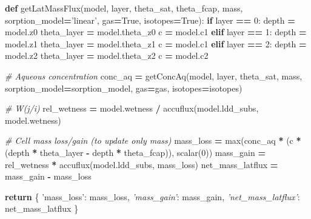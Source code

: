 \documentclass[]{article}
\newenvironment{Shaded}{\begin{snugshade}}{\end{snugshade}}
\newcommand{\KeywordTok}[1]{\textcolor[rgb]{0.13,0.29,0.53}{\textbf{{#1}}}}
\newcommand{\DecValTok}[1]{\textcolor[rgb]{0.00,0.00,0.81}{{#1}}}
\newcommand{\StringTok}[1]{\textcolor[rgb]{0.31,0.60,0.02}{{#1}}}
\newcommand{\CommentTok}[1]{\textcolor[rgb]{0.56,0.35,0.01}{\textit{{#1}}}}
\newcommand{\VariableTok}[1]{\textcolor[rgb]{0.00,0.00,0.00}{{#1}}}
\newcommand{\ControlFlowTok}[1]{\textcolor[rgb]{0.13,0.29,0.53}{\textbf{{#1}}}}
\newcommand{\OperatorTok}[1]{\textcolor[rgb]{0.81,0.36,0.00}{\textbf{{#1}}}}
\newcommand{\BuiltInTok}[1]{{#1}}
\newcommand{\NormalTok}[1]{{#1}}
\begin{document}
\begin{Shaded}
\begin{Highlighting}[]
\KeywordTok{def} \NormalTok{getLatMassFlux(model, layer, theta_sat, theta_fcap,}
                   \NormalTok{mass, sorption_model}\OperatorTok{=}\StringTok{'linear'}\NormalTok{, gas}\OperatorTok{=}\VariableTok{True}\NormalTok{, isotopes}\OperatorTok{=}\VariableTok{True}\NormalTok{):}
    \ControlFlowTok{if} \NormalTok{layer }\OperatorTok{==} \DecValTok{0}\NormalTok{:}
        \NormalTok{depth }\OperatorTok{=} \NormalTok{model.z0}
        \NormalTok{theta_layer }\OperatorTok{=} \NormalTok{model.theta_z0}
        \NormalTok{c }\OperatorTok{=} \NormalTok{model.c1}
    \ControlFlowTok{elif} \NormalTok{layer }\OperatorTok{==} \DecValTok{1}\NormalTok{:}
        \NormalTok{depth }\OperatorTok{=} \NormalTok{model.z1}
        \NormalTok{theta_layer }\OperatorTok{=} \NormalTok{model.theta_z1}
        \NormalTok{c }\OperatorTok{=} \NormalTok{model.c1}
    \ControlFlowTok{elif} \NormalTok{layer }\OperatorTok{==} \DecValTok{2}\NormalTok{:}
        \NormalTok{depth }\OperatorTok{=} \NormalTok{model.z2}
        \NormalTok{theta_layer }\OperatorTok{=} \NormalTok{model.theta_z2}
        \NormalTok{c }\OperatorTok{=} \NormalTok{model.c2}

    \CommentTok{# Aqueous concentration}
    \NormalTok{conc_aq }\OperatorTok{=} \NormalTok{getConcAq(model, layer, theta_sat, mass,}
                        \NormalTok{sorption_model}\OperatorTok{=}\NormalTok{sorption_model, gas}\OperatorTok{=}\NormalTok{gas, isotopes}\OperatorTok{=}\NormalTok{isotopes)}

    \CommentTok{# W(j/i)}
    \NormalTok{rel_wetness }\OperatorTok{=} \NormalTok{model.wetness }\OperatorTok{/} \NormalTok{accuflux(model.ldd_subs, model.wetness)}

    \CommentTok{# Cell mass loss/gain (to update only mass)}
    \NormalTok{mass_loss }\OperatorTok{=} \BuiltInTok{max}\NormalTok{(conc_aq }\OperatorTok{*} \NormalTok{(c }\OperatorTok{*} \NormalTok{(depth }\OperatorTok{*} \NormalTok{theta_layer }\OperatorTok{-} \NormalTok{depth }\OperatorTok{*} \NormalTok{theta_fcap)), scalar(}\DecValTok{0}\NormalTok{))}
    \NormalTok{mass_gain }\OperatorTok{=} \NormalTok{rel_wetness }\OperatorTok{*} \NormalTok{accuflux(model.ldd_subs, mass_loss)}
    \NormalTok{net_mass_latflux }\OperatorTok{=} \NormalTok{mass_gain }\OperatorTok{-} \NormalTok{mass_loss}

    \ControlFlowTok{return} \NormalTok{\{}
        \StringTok{'mass_loss'}\NormalTok{: mass_loss,}
        \CommentTok{'mass_gain'}\NormalTok{: mass_gain,}
        \CommentTok{'net_mass_latflux'}\NormalTok{: net_mass_latflux}
    \NormalTok{\}}
\end{Highlighting}
\end{Shaded}
\end{document}
